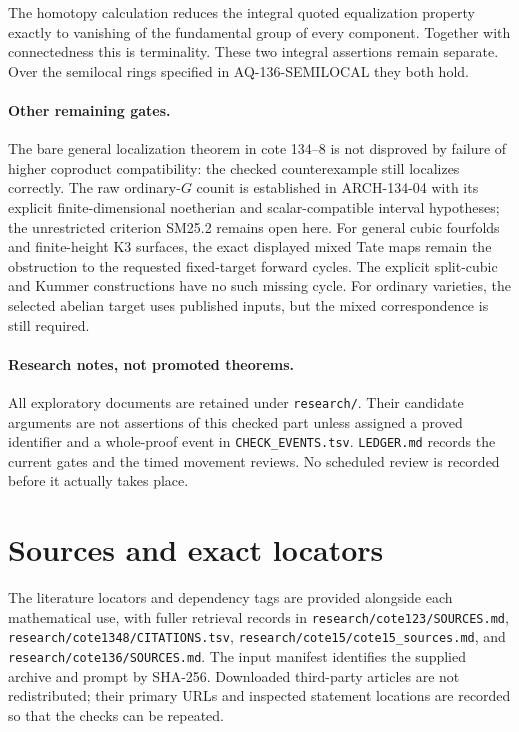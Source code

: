 \documentclass[11pt,a4paper]{article}
\begin{document}
The homotopy calculation reduces the integral quoted equalization
property exactly to vanishing of the fundamental group of every
component. Together with connectedness this is terminality. These
two integral assertions remain separate. Over the semilocal rings
specified in AQ-136-SEMILOCAL they both hold.

\paragraph{Other remaining gates.}
The bare general localization theorem in cote 134--8 is not disproved
by failure of higher coproduct compatibility: the checked counterexample
still localizes correctly. The raw ordinary-$G$ counit is established
in ARCH-134-04 with its explicit finite-dimensional noetherian and
scalar-compatible interval hypotheses; the unrestricted criterion
SM25.2 remains open here. For general cubic fourfolds and finite-height
K3 surfaces, the exact displayed mixed Tate maps remain the obstruction
to the requested fixed-target forward cycles. The explicit split-cubic
and Kummer constructions have no such missing cycle. For ordinary
varieties, the selected abelian target uses published inputs, but the
mixed correspondence is still required.

\paragraph{Research notes, not promoted theorems.}
All exploratory documents are retained under \texttt{research/}.
Their candidate arguments are not assertions of this checked part
unless assigned a proved identifier and a whole-proof event in
\texttt{CHECK\_EVENTS.tsv}. \texttt{LEDGER.md} records the current gates
and the timed movement reviews. No scheduled review is recorded before
it actually takes place.

\section{Sources and exact locators}
The literature locators and dependency tags are provided alongside
each mathematical use, with fuller retrieval records in
\nolinkurl{research/cote123/SOURCES.md},
\nolinkurl{research/cote1348/CITATIONS.tsv},
\texttt{research/cote15/cote15\_sources.md}, and
\texttt{research/cote136/SOURCES.md}. The input manifest identifies the
supplied archive and prompt by SHA-256. Downloaded third-party articles
are not redistributed; their primary URLs and inspected statement
locations are recorded so that the checks can be repeated.
\end{document}
